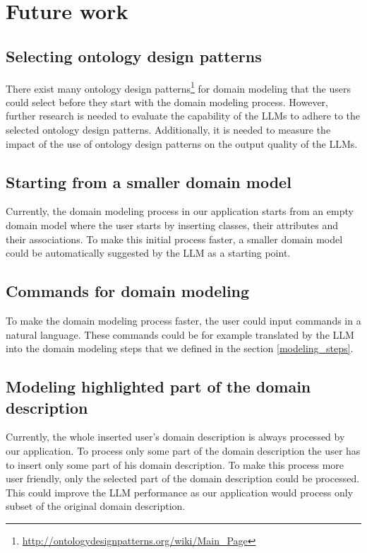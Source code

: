 \chapter{Future work}


\section{Selecting ontology design patterns}

There exist many ontology design patterns\footnote{\url{http://ontologydesignpatterns.org/wiki/Main_Page}} for domain modeling that the users could select before they start with the domain modeling process. However, further research is needed to evaluate the capability of the LLMs to adhere to the selected ontology design patterns. Additionally, it is needed to measure the impact of the use of ontology design patterns on the output quality of the LLMs. 


\section{Starting from a smaller domain model}

Currently, the domain modeling process in our application starts from an empty domain model where the user starts by inserting classes, their attributes and their associations. To make this initial process faster, a smaller domain model could be automatically suggested by the LLM as a starting point.


\section{Commands for domain modeling}

To make the domain modeling process faster, the user could input commands in a natural language. These commands could be for example translated by the LLM into the domain modeling steps that we defined in the section \ref{modeling_steps}.


\section{Modeling highlighted part of the domain description}

Currently, the whole inserted user's domain description is always processed by our application. To process only some part of the domain description the user has to insert only some part of his domain description. To make this process more user friendly, only the selected part of the domain description could be processed. This could improve the LLM performance as our application would process only subset of the original domain description.



